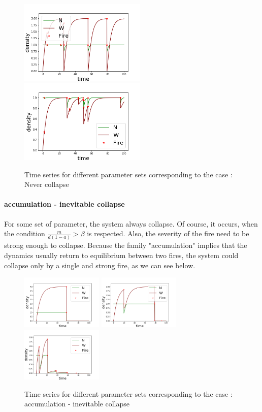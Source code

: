 \documentclass{article}
\begin{document}
\begin{figure}[h!]
\centering
\includegraphics[width=6cm]{return_never_1.png}
\includegraphics[width=6cm]{return_never_2.png}
\caption{Time series for different parameter sets corresponding to the case : Never collapse}
\end{figure}


\paragraph{accumulation - inevitable collapse\\} %
For some set of parameter, the system always collapse. Of course, it occurs, when the condition $\frac{m}{d( 1-a)} > \beta$ is respected. Also, the severity of the fire need to be strong enough to collapse. Because the family "accumulation" implies that the dynamics usually return to equilibrium between two fires, the system could collapse only by a single and strong fire, as we can see below.

\begin{figure}[h!]
\centering
\includegraphics[width=3.9cm]{return_always_1.png}
\includegraphics[width=3.9cm]{return_always_2.png}
\includegraphics[width=3.9cm]{return_always_3.png}
\caption{Time series for different parameter sets corresponding to the case : accumulation - inevitable collapse}
\end{figure}
\end{document}
